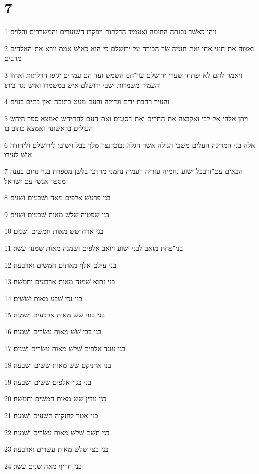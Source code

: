 \chapter{7}

\par 1 ויהי כאשׁר נבנתה החומה ואעמיד הדלתות ויפקדו השׁוערים והמשׁררים והלוים׃
\par 2 ואצוה את־חנני אחי ואת־חנניה שׂר הבירה על־ירושׁלם כי־הוא כאישׁ אמת וירא את־האלהים מרבים׃
\par 3 ויאמר להם לא יפתחו שׁערי ירושׁלם עד־חם השׁמשׁ ועד הם עמדים יגיפו הדלתות ואחזו והעמיד משׁמרות ישׁבי ירושׁלם אישׁ במשׁמרו ואישׁ נגד ביתו׃
\par 4 והעיר רחבת ידים וגדולה והעם מעט בתוכה ואין בתים בנוים׃
\par 5 ויתן אלהי אל־לבי ואקבצה את־החרים ואת־הסגנים ואת־העם להתיחשׂ ואמצא ספר היחשׂ העולים בראשׁונה ואמצא כתוב בו׃
\par 6 אלה בני המדינה העלים משׁבי הגולה אשׁר הגלה נבוכדנצר מלך בבל וישׁובו לירושׁלם וליהודה אישׁ לעירו׃
\par 7 הבאים עם־זרבבל ישׁוע נחמיה עזריה רעמיה נחמני מרדכי בלשׁן מספרת בגוי נחום בענה מספר אנשׁי עם ישׂראל׃
\par 8 בני פרעשׁ אלפים מאה ושׁבעים ושׁנים׃
\par 9 בני שׁפטיה שׁלשׁ מאות שׁבעים ושׁנים׃
\par 10 בני ארח שׁשׁ מאות חמשׁים ושׁנים׃
\par 11 בני־פחת מואב לבני ישׁוע ויואב אלפים ושׁמנה מאות שׁמנה עשׂר׃
\par 12 בני עילם אלף מאתים חמשׁים וארבעה׃
\par 13 בני זתוא שׁמנה מאות ארבעים וחמשׁה׃
\par 14 בני זכי שׁבע מאות ושׁשׁים׃
\par 15 בני בנוי שׁשׁ מאות ארבעים ושׁמנה׃
\par 16 בני בבי שׁשׁ מאות עשׂרים ושׁמנה׃
\par 17 בני עזגד אלפים שׁלשׁ מאות עשׂרים ושׁנים׃
\par 18 בני אדניקם שׁשׁ מאות שׁשׁים ושׁבעה׃
\par 19 בני בגוי אלפים שׁשׁים ושׁבעה׃
\par 20 בני עדין שׁשׁ מאות חמשׁים וחמשׁה׃
\par 21 בני־אטר לחזקיה תשׁעים ושׁמנה׃
\par 22 בני חשׁם שׁלשׁ מאות עשׂרים ושׁמנה׃
\par 23 בני בצי שׁלשׁ מאות עשׂרים וארבעה׃
\par 24 בני חריף מאה שׁנים עשׂר׃
